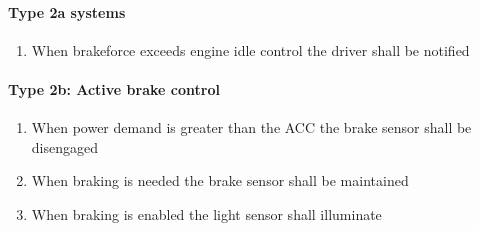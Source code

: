 \paragraph{Type 2a systems}
\begin{enumerate}
    \item{When brakeforce exceeds engine idle control the driver shall be notified}
\end{enumerate}

\paragraph{Type 2b: Active brake control}
\begin{enumerate}
    \item{When power demand is greater than the ACC the brake sensor shall be disengaged}
    \item{When braking is needed the brake sensor shall be maintained}
    \item{When braking is enabled the light sensor shall illuminate}
\end{enumerate}

